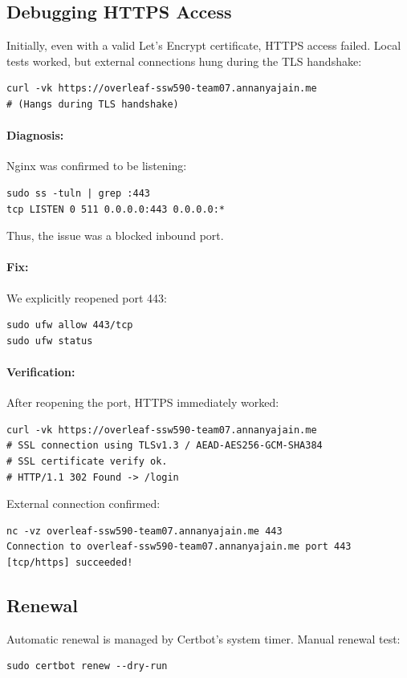 \subsection{Debugging HTTPS Access}
Initially, even with a valid Let's Encrypt certificate, HTTPS access failed.  
Local tests worked, but external connections hung during the TLS handshake:
\begin{verbatim}
curl -vk https://overleaf-ssw590-team07.annanyajain.me
# (Hangs during TLS handshake)
\end{verbatim}

\paragraph{Diagnosis:}
Nginx was confirmed to be listening:
\begin{verbatim}
sudo ss -tuln | grep :443
tcp LISTEN 0 511 0.0.0.0:443 0.0.0.0:*
\end{verbatim}
Thus, the issue was a blocked inbound port.

\paragraph{Fix:}
We explicitly reopened port 443:
\begin{verbatim}
sudo ufw allow 443/tcp
sudo ufw status
\end{verbatim}

\paragraph{Verification:}
After reopening the port, HTTPS immediately worked:
\begin{verbatim}
curl -vk https://overleaf-ssw590-team07.annanyajain.me
# SSL connection using TLSv1.3 / AEAD-AES256-GCM-SHA384
# SSL certificate verify ok.
# HTTP/1.1 302 Found -> /login
\end{verbatim}

External connection confirmed:
\begin{verbatim}
nc -vz overleaf-ssw590-team07.annanyajain.me 443
Connection to overleaf-ssw590-team07.annanyajain.me port 443 [tcp/https] succeeded!
\end{verbatim}

\subsection{Renewal}
Automatic renewal is managed by Certbot’s system timer.  
Manual renewal test:
\begin{verbatim}
sudo certbot renew --dry-run
\end{verbatim}

